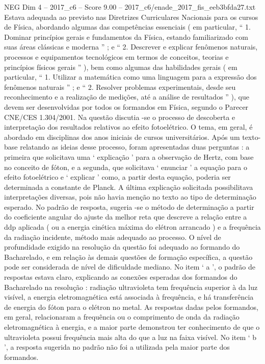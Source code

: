 \begin{textsample}{NEG Dim 4 – 2017\_c6 – Score 9.00 – 2017\_c6/enade\_2017\_fis\_eeb3bfda27.txt}
Estava adequada ao previsto nas Diretrizes Curriculares Nacionais para os cursos de Física, abordando algumas das competências essenciais ( em particular, “ 1.
Dominar princípios gerais e fundamentos da Física, estando familiarizado com suas áreas clássicas e moderna ” ; e “ 2.
Descrever e explicar fenômenos naturais, processos e equipamentos tecnológicos em termos de conceitos, teorias e princípios físicos gerais ” ), bem como algumas das habilidades gerais ( em particular, “ 1.
Utilizar a matemática como uma linguagem para a expressão dos fenômenos naturais ” ; e “ 2.
Resolver problemas experimentais, desde seu reconhecimento e a realização de medições, até a análise de resultados ” ), que devem ser desenvolvidas por todos os formandos em Física, segundo o Parecer CNE/CES 1.304/2001.
Na questão discutia -se o processo de descoberta e interpretação dos resultados relativos ao efeito fotoelétrico.
O tema, em geral, é abordado em disciplinas dos anos iniciais de cursos universitários.
Após um texto-base relatando as ideias desse processo, foram apresentadas duas perguntas : a primeira que solicitava uma ‘ explicação ’ para a observação de Hertz, com base no conceito de fóton, e a segunda, que solicitava ‘ enunciar ’ a equação para o efeito fotoelétrico e ‘ explicar ’ como, a partir desta equação, poderia ser determinada a constante de Planck.
A última explicação solicitada possibilitava interpretações diversas, pois não havia menção no texto ao tipo de determinação esperado.
No padrão de resposta, sugeria -se o método de determinação a partir do coeficiente angular do ajuste da melhor reta que descreve a relação entre a ddp aplicada ( ou a energia cinética máxima do elétron arrancado ) e a frequência da radiação incidente, método mais adequado ao processo.
O nível de profundidade exigido na resolução da questão foi adequado ao formando do Bacharelado, e em relação às demais questões de formação específica, a questão pode ser considerada de nível de dificuldade mediano.
No item ‘ a ’, o padrão de respostas estava claro, explicando as conexões esperadas dos formandos do Bacharelado na resolução : radiação ultravioleta tem frequência superior à da luz visível, a energia eletromagnética está associada à frequência, e há transferência de energia do fóton para o elétron no metal.
As respostas dadas pelos formandos, em geral, relacionaram a frequência ou o comprimento de onda da radiação eletromagnética à energia, e a maior parte demonstrou ter conhecimento de que o ultravioleta possui frequência mais alta do que a luz na faixa visível.
No item ‘ b ’, a resposta sugerida no padrão não foi a utilizada pela maior parte dos formandos.

\end{textsample}
